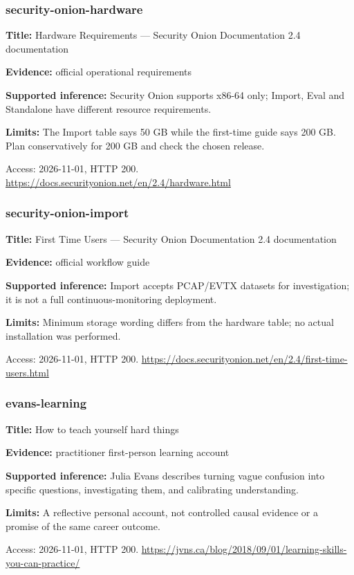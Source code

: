 \subsubsection{security-onion-hardware}
\noindent\textbf{Title:} Hardware Requirements — Security Onion Documentation 2.4 documentation\par
\noindent\textbf{Evidence:} official operational requirements\par
\noindent\textbf{Supported inference:} Security Onion supports x86-64 only; Import, Eval and Standalone have different resource requirements.\par
\noindent\textbf{Limits:} The Import table says 50 GB while the first-time guide says 200 GB. Plan conservatively for 200 GB and check the chosen release.\par
\noindent Access: 2026-11-01, HTTP 200. \url{https://docs.securityonion.net/en/2.4/hardware.html}
\subsubsection{security-onion-import}
\noindent\textbf{Title:} First Time Users — Security Onion Documentation 2.4 documentation\par
\noindent\textbf{Evidence:} official workflow guide\par
\noindent\textbf{Supported inference:} Import accepts PCAP/EVTX datasets for investigation; it is not a full continuous-monitoring deployment.\par
\noindent\textbf{Limits:} Minimum storage wording differs from the hardware table; no actual installation was performed.\par
\noindent Access: 2026-11-01, HTTP 200. \url{https://docs.securityonion.net/en/2.4/first-time-users.html}
\subsubsection{evans-learning}
\noindent\textbf{Title:} How to teach yourself hard things\par
\noindent\textbf{Evidence:} practitioner first-person learning account\par
\noindent\textbf{Supported inference:} Julia Evans describes turning vague confusion into specific questions, investigating them, and calibrating understanding.\par
\noindent\textbf{Limits:} A reflective personal account, not controlled causal evidence or a promise of the same career outcome.\par
\noindent Access: 2026-11-01, HTTP 200. \url{https://jvns.ca/blog/2018/09/01/learning-skills-you-can-practice/}
